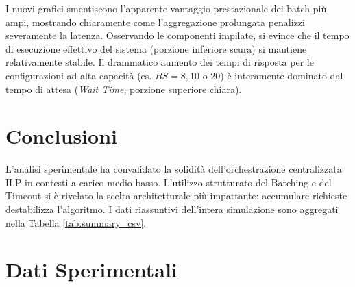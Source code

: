 \documentclass[11pt,a4paper]{article}
\begin{document}
I nuovi grafici smentiscono l'apparente vantaggio prestazionale dei batch più ampi, mostrando chiaramente come l'aggregazione prolungata penalizzi severamente la latenza. Osservando le componenti impilate, si evince che il tempo di esecuzione effettivo del sistema (porzione inferiore scura) si mantiene relativamente stabile. Il drammatico aumento dei tempi di risposta per le configurazioni ad alta capacità (es. $BS=8, 10$ o $20$) è interamente dominato dal tempo di attesa (\textit{Wait Time}, porzione superiore chiara).


\section{Conclusioni}


L'analisi sperimentale ha convalidato la solidità dell'orchestrazione centralizzata ILP in contesti a carico medio-basso. L'utilizzo strutturato del Batching e del Timeout si è rivelato la scelta architetturale più impattante: accumulare richieste destabilizza l'algoritmo. I dati riassuntivi dell'intera simulazione sono aggregati nella Tabella \ref{tab:summary_csv}.

\section{Dati Sperimentali}
\end{document}
